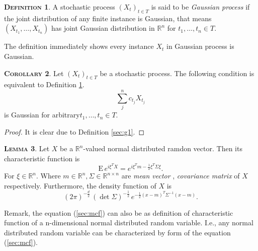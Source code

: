 \documentclass[a4paper, twoside, 11pt]{article}
\theoremstyle{definition}
\newtheorem{definition}{\scshape Definition}[section]
\newtheorem{lemma}[definition]{\scshape Lemma}
\newtheorem{corollary}[definition]{\scshape Corollary}
\begin{document}
\begin{definition}
  A stochastic process $(X_t)_{t\in T}$ is said to be \emph{Gaussian process} if the joint distribution of any finite instance is Gaussian, that means
$
(X_{t_1},\dots, X_{t_n})
$ has joint Gaussian distribution in $\mathbb{R}^n$ for $t_1,\dots,t_n \in T$.
\label{sec:defgau}
\end{definition}
The definition immediately shows every instance $X_t$ in Gaussian process is Gaussian.

\begin{corollary}
  Let $(X_t)_{t\in T}$ be a stochastic process. The following condition is equivalent to Definition \ref{sec:defgau}.
  \begin{equation}
	\sum_j^n c_{t_j} X_{t_j}
  \end{equation}
  is Gaussian for arbitrary$t_1,\dots,t_n \in T$.
  \label{sec:gauss}
\end{corollary}
\begin{proof}
  It is clear due to Definition \ref{sec:g1}.
\end{proof}

\begin{lemma}
  Let $X$ be a $\mathbb{R}^{n}$-valued normal distributed ramdon vector. Then its characteristic function is 
  \begin{equation}
	\mathrm{E}\,e^{i\xi^TX} = e^{i\xi^Tm - \frac{1}{2}\xi^T \Sigma \xi}.
	\label{sec:mcf}
  \end{equation}
 For $\xi \in \mathbb{R}^{n}$. Where $m \in \mathbb{R}^{n}, \Sigma \in \mathbb{R}^{n\times n}$ are \emph{mean vector} , \emph{covariance matrix} of $X$ respectively. Furthermore, the density function of $X$ is
\begin{equation}
  (2\pi)^{-\frac{d}{2}}\, (\det\Sigma) ^{-\frac{1}{2}}\,e^{-\frac{1}{2}(x-m)^T\Sigma^{-1}(x-m)}.
  \label{sec:dsy}
\end{equation}
\end{lemma}

Remark, the equation (\ref{sec:mcf}) can also be as definition of characteristic function of a n-dimensional normal distributed random variable. I.e., any normal distributed random variable can be characterized by form of the equation (\ref{sec:mcf}).
\end{document}
